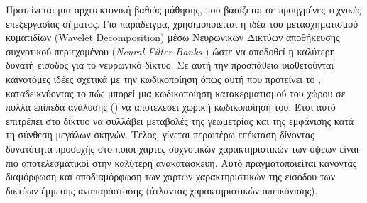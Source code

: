 \par
    Προτείνεται μια αρχιτεκτονική βαθιάς μάθησης, που βασίζεται σε προηγμένες τεχνικές επεξεργασίας σήματος. Για παράδειγμα, χρησιμοποιείται η ιδέα του μετασχηματισμού κυματιδίων (Wavelet Decomposition) μέσω Νευρωνικών Δικτύων αποθήκευσης συχνοτικού περιεχομένου (\textit{Neural Filter Banks} \cite{wu2023neural}) ώστε να αποδοθεί η καλύτερη δυνατή είσοδος για το νευρωνικό  δίκτυο. Σε αυτή την προσπάθεια υιοθετούνται καινοτόμες ιδέες σχετικά με την κωδικοποίηση όπως αυτή που προτείνει το \cite{mueller2022instant}, καταδεικνύοντας το πώς μπορεί μια κωδικοποίηση κατακερματισμού του χώρου σε πολλά επίπεδα ανάλυσης () να αποτελέσει χωρική κωδικοποίησή του. Έτσι αυτό επιτρέπει στο δίκτυο να συλλάβει μεταβολές της γεωμετρίας και της εμφάνισης κατά τη σύνθεση μεγάλων σκηνών.
    Τέλος, γίνεται περαιτέρω επέκταση δίνοντας δυνατότητα προσοχής στο ποιοι χάρτες συχνοτικών χαρακτηριστικών των όψεων είναι πιο αποτελεσματικοί στην καλύτερη ανακατασκευή. Αυτό πραγματοποιείται κάνοντας διαμόρφωση και αποδιαμόρφωση των χαρτών χαρακτηριστικών της εισόδου των δικτύων έμμεσης αναπαράστασης (άτλαντας χαρακτηριστικών απεικόνισης). 
    